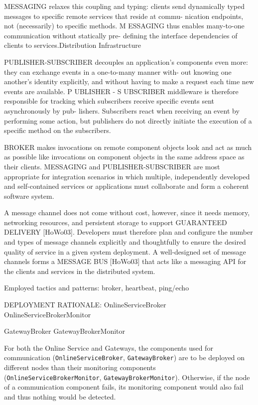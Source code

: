     MESSAGING relaxes this coupling and typing: clients send dynamically
    typed messages to specific remote services that reside at commu-
    nication endpoints, not (necessarily) to specific methods. M ESSAGING
    thus enables many-to-one communication without statically pre-
    defining the interface dependencies of clients to services.Distribution Infrastructure

    PUBLISHER-SUBSCRIBER decouples an application’s components even
    more: they can exchange events in a one-to-many manner with-
    out knowing one another’s identity explicitly, and without having
    to make a request each time new events are available. P UBLISHER -
    S UBSCRIBER middleware is therefore responsible for tracking which
    subscribers receive specific events sent asynchronously by pub-
    lishers. Subscribers react when receiving an event by performing
    some action, but publishers do not directly initiate the execution of
    a specific method on the subscribers.

    BROKER makes invocations
    on remote component objects look and act as much as possible
    like invocations on component objects in the same address space
    as their clients. MESSAGING and PUBLISHER-SUBSCRIBER are most appropriate
    for integration scenarios in which multiple, independently
    developed and self-contained services or applications must collaborate
    and form a coherent software system.

    A message channel does not come without cost, however, since it
    needs memory, networking resources, and persistent storage to support
    GUARANTEED DELIVERY [HoWo03]. Developers must therefore plan
    and configure the number and types of message channels explicitly
    and thoughtfully to ensure the desired quality of service in a given
    system deployment. A well-designed set of message channels forms a
    MESSAGE BUS [HoWo03] that acts like a messaging API for the clients
    and services in the distributed system.

    Employed tactics and patterns: broker, heartbeat, ping/echo

    DEPLOYMENT RATIONALE:
        OnlineServiceBroker
        OnlineServiceBrokerMonitor

        GatewayBroker
        GatewayBrokerMonitor

        For both the Online Service and Gateways, the components used for communication
        (\texttt{OnlineServiceBroker}, \texttt{GatewayBroker}) are to be deployed on different nodes than
        their monitoring components (\texttt{OnlineServiceBrokerMonitor}, \texttt{GatewayBrokerMonitor}).
        Otherwise, if the node of a communication
        component fails, its monitoring component would also fail and thus
        nothing would be detected.

